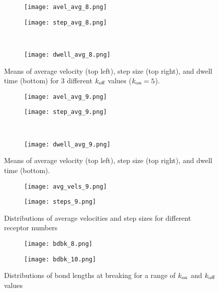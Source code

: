 \documentclass{article}
\newcommand{\tn}{\textnormal}
\begin{document}
\begin{figure}[h]
  \centering
  \begin{subfigure}{0.49\textwidth}
    \texttt{[image: avel\_avg\_8.png]}
  \end{subfigure}
  \hfill
  \begin{subfigure}{0.49\textwidth}
    \texttt{[image: step\_avg\_8.png]}
  \end{subfigure}
  \\
  \begin{subfigure}{0.49\textwidth}
    \texttt{[image: dwell\_avg\_8.png]}
  \end{subfigure}
  \label{fig:stats8}
  \caption{Means of average velocity (top left), step size (top
    right), and dwell time (bottom) for 3 different $k_\tn{off}$
    values ($k_\tn{on} = 5$).}
\end{figure}

\begin{figure}[h]
  \centering
  \begin{subfigure}{0.49\textwidth}
    \texttt{[image: avel\_avg\_9.png]}
  \end{subfigure}
  \hfill
  \begin{subfigure}{0.49\textwidth}
    \texttt{[image: step\_avg\_9.png]}
  \end{subfigure}
  \\
  \begin{subfigure}{0.49\textwidth}
    \texttt{[image: dwell\_avg\_9.png]}
  \end{subfigure}
  \label{fig:stats9}
  \caption{Means of average velocity (top left), step size (top
    right), and dwell time (bottom).}
\end{figure}

\begin{figure}[h]
  \centering
  \begin{subfigure}{0.49\textwidth}
    \texttt{[image: avg\_vels\_9.png]}
  \end{subfigure}
  \hfill
  \begin{subfigure}{0.49\textwidth}
    \texttt{[image: steps\_9.png]}
  \end{subfigure}
  \caption{Distributions of average velocities and step sizes for
    different receptor numbers}
  \label{fig:avg-vels9}
\end{figure}

\begin{figure}[h]
  \centering
  \begin{subfigure}{0.49\textwidth}
    \texttt{[image: bdbk\_8.png]}
  \end{subfigure}
  \hfill
  \begin{subfigure}{0.49\textwidth}
    \texttt{[image: bdbk\_10.png]}
  \end{subfigure}
  \caption{Distributions of bond lengths at breaking for a range of
    $k_\tn{on}$ and $k_\tn{off}$ values}
  \label{fig:bdbk}
\end{figure}
\end{document}
